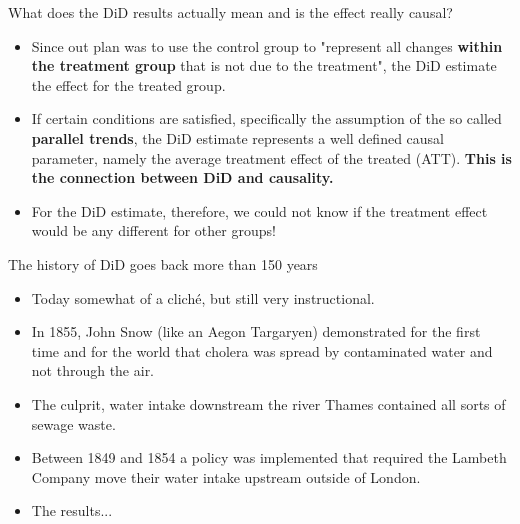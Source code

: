 \documentclass[notes,11pt, aspectratio=169]{beamer}
\begin{document}
\begin{frame}{What does the DiD results actually mean and is the effect really causal?}
        \begin{itemize}        
        \item Since out plan was to use the control group to "represent all changes \textbf{within the treatment group} that is not due to the treatment", the DiD estimate the effect for the treated group. 

        \item If certain conditions are satisfied, specifically the assumption of the so called \textbf{parallel trends}, the DiD estimate represents a well defined causal parameter, namely the average treatment effect of the treated (ATT). \textbf{This is the connection between DiD and causality.}
        
        \item For the DiD estimate, therefore, we could not know if the treatment effect would be any different for other groups!        
    \end{itemize}
\end{frame}

\begin{frame}{The history of DiD goes back more than 150 years}
    \begin{itemize}
        \item Today somewhat of a cliché, but still very instructional.
        \item In 1855, John Snow (like an Aegon Targaryen) demonstrated for the first time and for the world that cholera was spread by contaminated water and not through the air. 
        \item The culprit, water intake downstream the river Thames contained all sorts of sewage waste.
        \item Between 1849 and 1854 a policy was implemented that required the Lambeth Company move their water intake upstream outside of London. 
        \item The results...        
    \end{itemize}
\end{frame}
\end{document}
